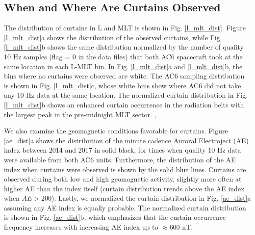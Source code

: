 \documentclass[draft]{agujournal2019}
\begin{document}
\subsection{When and Where Are Curtains Observed}
The distribution of curtains in L and MLT is shown in Fig. \ref{l_mlt_dist}. Figure \ref{l_mlt_dist}a shows the distribution of the observed curtains, while Fig. \ref{l_mlt_dist}b shows the same distribution normalized by the number of quality 10 Hz samples (flag = 0 in the data files) that both AC6 spacecraft took at the same location in each L-MLT bin. In Fig. \ref{l_mlt_dist}a and \ref{l_mlt_dist}b, the bins where no curtains were observed are white. The AC6 sampling distribution is shown in Fig. \ref{l_mlt_dist}c, whose white bins show where AC6 did not take any 10 Hz data at the same location. The normalized curtain distribution in Fig. \ref{l_mlt_dist}b shows an enhanced curtain occurrence in the radiation belts  with the largest peak in the pre-midnight MLT sector.  \cite<Figure 2 in>{O'brien2019}, 

We also examine the geomagnetic conditions favorable for curtains. Figure \ref{ae_dist}a shows the distribution of the minute cadence Auroral Electroject (AE) index between 2014 and 2017 in solid black, for times when quality 10 Hz data were available from both AC6 units. Furthermore, the distribution of the AE index when curtains were observed is shown by the solid blue lines. Curtains are observed during both low and high geomagnetic activity, slightly more often at higher AE than the index itself (curtain distribution trends above the AE index when $AE > 200$). Lastly, we normalized the curtain distribution in Fig. \ref{ae_dist}a assuming any AE index is equally probable. The normalized curtain distribution is shown in Fig. \ref{ae_dist}b, which emphasizes that the curtain occurrence frequency increases with increasing AE index up to $\approx 600$ nT.
\end{document}
